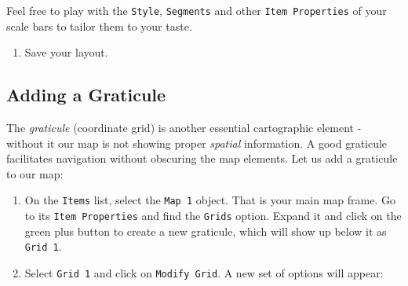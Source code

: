 \documentclass[
  letterpaper,
  DIV=11,
  numbers=noendperiod]{scrreprt}
\providecommand{\tightlist}{%
  \setlength{\itemsep}{0pt}\setlength{\parskip}{0pt}}\usepackage{longtable,booktabs,array}
\begin{document}
\begin{tcolorbox}[enhanced jigsaw, coltitle=black, toprule=.15mm, breakable, opacitybacktitle=0.6, left=2mm, colback=white, leftrule=.75mm, rightrule=.15mm, colbacktitle=quarto-callout-tip-color!10!white, toptitle=1mm, titlerule=0mm, colframe=quarto-callout-tip-color-frame, arc=.35mm, bottomtitle=1mm, opacityback=0, bottomrule=.15mm, title=\textcolor{quarto-callout-tip-color}{\faLightbulb}\hspace{0.5em}{Tip}]

Feel free to play with the \texttt{Style}, \texttt{Segments} and other
\texttt{Item\ Properties} of your scale bars to tailor them to your
taste.

\end{tcolorbox}

\begin{enumerate}
\def\labelenumi{(\arabic{enumi})}
\setcounter{enumi}{252}
\tightlist
\item
  Save your layout.
\end{enumerate}

\subsection{Adding a Graticule}\label{adding-a-graticule}

The \emph{graticule} (coordinate grid) is another essential cartographic
element - without it our map is not showing proper \emph{spatial}
information. A good graticule facilitates navigation without obscuring
the map elements. Let us add a graticule to our map:

\begin{enumerate}
\def\labelenumi{(\arabic{enumi})}
\setcounter{enumi}{253}
\item
  On the \texttt{Items} list, select the \texttt{Map\ 1} object. That is
  your main map frame. Go to its \texttt{Item\ Properties} and find the
  \texttt{Grids} option. Expand it and click on the green plus button to
  create a new graticule, which will show up below it as
  \texttt{Grid\ 1}.
\item
  Select \texttt{Grid\ 1} and click on \texttt{Modify\ Grid}. A new set
  of options will appear:
\end{enumerate}
\end{document}

